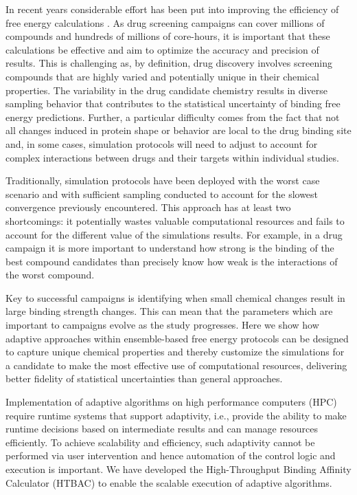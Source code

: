 In recent years considerable effort has been put into improving the efficiency 
of free energy calculations \cite{Klimovich2015, Naden2016, Kaus2013}.
As drug screening campaigns can cover millions of compounds and hundreds of
millions of core-hours, it is important that these calculations be effective
and aim to optimize the accuracy and precision of results.
This is challenging as, by definition, drug discovery involves
screening compounds that are highly varied and potentially unique in their
chemical properties. The variability in the drug candidate chemistry results
in diverse sampling behavior that contributes to the statistical uncertainty of
binding free energy predictions.
Further, a particular difficulty comes from
the fact that not all changes induced in protein shape or behavior are local
to the drug binding site and, in some cases, simulation protocols will need
to adjust to account for complex interactions between drugs and their targets
within individual studies.

Traditionally, simulation protocols have been deployed with the worst case
scenario and with sufficient sampling conducted to account for the slowest
convergence previously encountered. This approach has at least two
shortcomings: it potentially wastes valuable computational resources  and
fails to account for the different value of the simulations results. For
example, in a drug campaign it is more important to understand how strong is
the binding of the best compound candidates than precisely know how weak is
the interactions of the worst compound.

Key to successful campaigns is identifying when small chemical changes result
in large binding strength changes. This can mean that the parameters which
are important to campaigns evolve as the study progresses. Here we show how
adaptive approaches within ensemble-based free energy protocols can be
designed to capture unique chemical properties and thereby customize the
simulations for a candidate to make the most effective use of computational
resources, delivering better fidelity of statistical uncertainties than
general approaches.

Implementation of adaptive algorithms on high performance computers (HPC)
require runtime systems that support adaptivity, i.e., provide the ability to
make runtime decisions based on intermediate results and can manage resources
efficiently. To achieve scalability and efficiency, such adaptivity cannot be
performed via user intervention and hence automation of the control logic and
execution is important. We have developed the High-Throughput Binding
Affinity Calculator (HTBAC) to enable the scalable execution of adaptive
algorithms.


